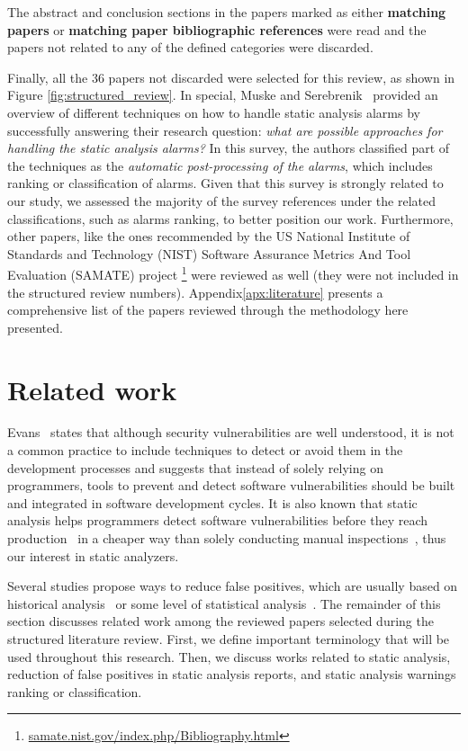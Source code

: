 The abstract and conclusion sections in the papers marked as either
\textbf{matching papers} or \textbf{matching paper bibliographic references} were read and the
papers not related to any of the defined categories were discarded.

Finally, all the 36 papers not discarded were selected for this review, as
shown in Figure \ref{fig:structured_review}. In special, Muske and
Serebrenik~\cite{muske2016survey} provided an overview of different techniques
on how to handle static analysis alarms by successfully answering their
research question: \textit{what are possible approaches for handling the static
analysis alarms?} In this survey, the authors classified part of the techniques
as the \textit{automatic post-processing of the alarms}, which includes ranking
or classification of alarms. Given that this survey is strongly related to our
study, we assessed the majority of the survey references under the related
classifications, such as alarms ranking, to better position our work.
Furthermore, other papers, like the ones recommended by the US National
Institute of Standards and Technology (NIST) Software Assurance Metrics And
Tool Evaluation (SAMATE) project
\footnote{\url{samate.nist.gov/index.php/Bibliography.html}} were reviewed as
well (they were not included in the structured review numbers).
Appendix\ref{apx:literature} presents a comprehensive list of the papers
reviewed through the methodology here presented.

\section{Related work}
\label{sec:related_work}

Evans~\cite{evans_improving_2002} states that although security vulnerabilities
are well understood, it is not a common practice to include techniques to detect
or avoid them in the development processes and suggests that instead of solely
relying on programmers, tools to prevent and detect software vulnerabilities
should be built and integrated in software development cycles. It is also
known that static analysis helps programmers detect software vulnerabilities
before they reach production~\cite{evans_improving_2002} in a cheaper way than
solely conducting manual inspections~\cite{johnson_why_2013}, thus our interest
in static analyzers.

Several studies propose ways to reduce false positives, which are usually based
on historical analysis~\cite{penta_evolution_2008, spacco_tracking_2006,
kim_which_2007} or some level of statistical analysis~\cite{muske2013review,
boogerd2006prioritizing, kremenek2003z, ruthruff_predicting_2008}. The
remainder of this section discusses related work among the reviewed papers
selected during the structured literature review. First, we define important
terminology that will be used throughout this research. Then, we discuss works
related to static analysis, reduction of false positives in static analysis
reports, and static analysis warnings ranking or classification.

